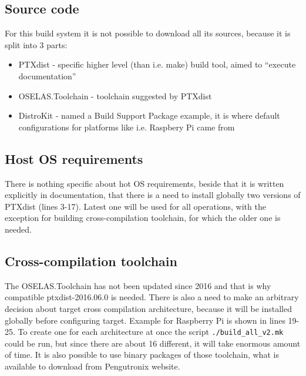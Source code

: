 \documentclass[printmode]{mgr}
\begin{document}



\subsection*{Source code}

For this build system it is not possible to download all its sources, because it is split into 3 parts:

\begin{itemize}
    \item PTXdist - specific higher level (than i.e. make) build tool, aimed to ``execute documentation''
    \item OSELAS.Toolchain - toolchain suggested by PTXdist
    \item DistroKit - named a Build Support Package example, it is where default configurations for platforms like i.e. Raspbery Pi came from
\end{itemize}

\subsection*{Host OS requirements}

There is nothing specific about hot OS requirements, beside that it is written explicitly in documentation, that there is a need to install globally two versions of PTXdist (lines 3-17).
Latest one will be used for all operations, with the exception for building cross-compilation toolchain, for which the older one is needed.

\subsection*{Cross-compilation toolchain}

The OSELAS.Toolchain has not been updated since 2016 and that is why compatible ptxdist-2016.06.0 is needed.
There is also a need to make an arbitrary decision about target cross compilation architecture, because it will be installed globally before configuring target.
Example for Raspberry Pi is shown in lines 19-25.
To create one for each architecture at once the script \verb|./build_all_v2.mk| could be run, but since there are about 16 different, it will take enormous amount of time.
It is also possible to use binary packages of those toolchain, what is available to download from Pengutronix website.
\end{document}
